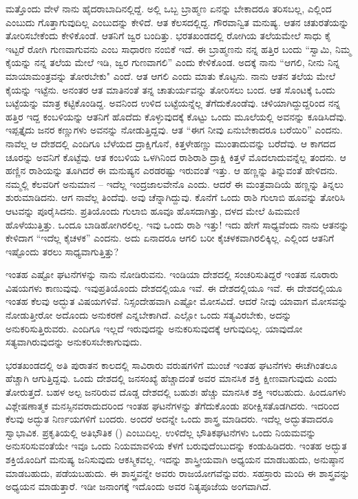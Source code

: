 ಮತ್ತೊಂದು ವೇಳೆ ನಾನು ಹೈದರಾಬಾದಿನಲ್ಲಿದ್ದೆ. ಅಲ್ಲಿ ಒಬ್ಬ ಬ್ರಾಹ್ಮಣ ಏನನ್ನು ಬೇಕಾದರೂ ತರಿಸಬಲ್ಲ, ಎಲ್ಲಿಂದ ಎಂಬುದು ಗೊತ್ತಾಗುವುದಿಲ್ಲ ಎಂಬುದನ್ನು ಕೇಳಿದೆ. ಆತ ಕೆಲಸದಲ್ಲಿದ್ದ. ಗೌರವಾನ್ವಿತ ಮನುಷ್ಯ. ಆತನ ಚತುರತೆಯನ್ನು ತೋರಿಸಬೇಕೆಂದು ಕೇಳಿಕೊಂಡೆ. ಆತನಿಗೆ ಜ್ವರ ಬಂದಿತ್ತು. ಭರತಖಂಡದಲ್ಲಿ ರೋಗಿಯ ತಲೆಯಮೇಲೆ ಸಾಧು ಕೈ ಇಟ್ಟರೆ ರೋಗಿ ಗುಣವಾಗುವನು ಎಂಬ ಸಾಧಾರಣ ನಂಬಿಕೆ ಇದೆ. ಈ ಬ್ರಾಹ್ಮಣನು ನನ್ನ ಹತ್ತಿರ ಬಂದು “ಸ್ವಾಮಿ, ನಿಮ್ಮ ಕೈಯನ್ನು ನನ್ನ ತಲೆಯ ಮೇಲೆ ಇಡಿ, ಜ್ವರ ಗುಣವಾಗಲಿ'' ಎಂದು ಕೇಳಿಕೊಂಡ. ಅದಕ್ಕೆ ನಾನು “ಆಗಲಿ, ನೀನು ನಿನ್ನ ಮಾಯಾಮಂತ್ರವನ್ನು ತೋರಬೇಕು" ಎಂದೆ. ಆತ ಆಗಲಿ ಎಂದು ಮಾತು ಕೊಟ್ಟನು. ನಾನು ಆತನ ತಲೆಯ ಮೇಲೆ ಕೈಯನ್ನು ಇಟ್ಟೆನು. ಅನಂತರ ಆತ ಮಾತಿನಂತೆ ತನ್ನ ಚಾತುರ್ಯವನ್ನು ತೋರಿಸಲು ಬಂದ. ಆತ ಸೊಂಟಕ್ಕೆ ಒಂದು ಬಟ್ಟೆಯನ್ನು ಮಾತ್ರ ಕಟ್ಟಿಕೊಂಡಿದ್ದ. ಅವನಿಂದ ಉಳಿದ ಬಟ್ಟೆಯನ್ನೆಲ್ಲ ತೆಗೆದುಕೊಂಡೆವು. ಚಳಿಯಾಗಿದ್ದುದ್ದರಿಂದ ನನ್ನ ಹತ್ತಿರ ಇದ್ದ ಕಂಬಳಿಯನ್ನು ಆತನಿಗೆ ಹೊದೆದು ಕೊಳ್ಳುವುದಕ್ಕೆ ಕೊಟ್ಟು ಒಂದು ಮೂಲೆಯಲ್ಲಿ ಅವನನ್ನು ಕೂಡಿಸಿದೆವು. ಇಪ್ಪತ್ತೈದು ಜನರ ಕಣ್ಣುಗಳು ಅವನನ್ನು ನೋಡುತ್ತಿದ್ದವು. ಆತ “ಈಗ ನೀವು ಏನುಬೇಕಾದರೂ ಬರೆಯಿರಿ'' ಎಂದನು. ನಾವೆಲ್ಲ ಆ ದೇಶದಲ್ಲಿ ಎಂದಿಗೂ ಬೆಳೆಯದ ದ್ರಾಕ್ಷಿಗೊನೆ, ಕಿತ್ತಳೇಹಣ್ಣು ಮುಂತಾದುವನ್ನು ಬರೆದೆವು. ಆ ಕಾಗದದ ಚೂರನ್ನು ಅವನಿಗೆ ಕೊಟ್ಟೆವು. ಆತ ಕಂಬಳಿಯ ಒಳಗಿನಿಂದ ರಾಶಿರಾಶಿ ದ್ರಾಕ್ಷಿ ಕಿತ್ತಳೆ ಮೊದಲಾದುವನ್ನೆಲ್ಲ ತಂದನು. ಆ ಹಣ್ಣಿನ ರಾಶಿಯನ್ನು ತೂಗಿದರೆ ಈ ಮನುಷ್ಯನ ಎರಡರಷ್ಟು ಇರುವಂತೆ ಇತ್ತು. ಆ ಹಣ್ಣನ್ನು ತಿನ್ನುವಂತೆ ಹೇಳಿದನು. ನಮ್ಮಲ್ಲಿ ಕೆಲವರಿಗೆ ಅನುಮಾನ – ಇದೆಲ್ಲ ಇಂದ್ರಜಾಲವೇನೊ ಎಂದು. ಆದರೆ ಈ ಮಂತ್ರವಾದಿಯೆ ಹಣ್ಣನ್ನು ತಿನ್ನಲು ಶುರುಮಾಡಿದನು. ಆಗ ನಾವೆಲ್ಲ ತಿಂದೆವು. ಅವು ಚೆನ್ನಾಗಿದ್ದುವು. ಕೊನೆಗೆ ಒಂದು ರಾಶಿ ಗುಲಾಬಿ ಹೂವನ್ನು ತೋರಿಸಿ ಆಟವನ್ನು ಪೂರೈಸಿದನು. ಪ್ರತಿಯೊಂದು ಗುಲಾಬಿ ಹೂವೂ ಹೊಸದಾಗಿತ್ತು, ದಳದ ಮೇಲೆ ಹಿಮಮಣಿ ಹೊಳೆಯುತ್ತಿತ್ತು. ಒಂದೂ ಬಾಡಿಹೋಗಿರಲಿಲ್ಲ. ಇವು ಒಂದು ರಾಶಿ ಇತ್ತು! ಇದು ಹೇಗೆ ಸಾಧ್ಯವೆಂದು ನಾನು ಆತನನ್ನು ಕೇಳಿದಾಗ “ಇದೆಲ್ಲ ಕೈಚಳಕ'' ಎಂದನು. ಅದು ಏನಾದರೂ ಆಗಲಿ ಬರೀ ಕೈಚಳಕವಾಗಿರಲಿಕ್ಕಿಲ್ಲ. ಎಲ್ಲಿಂದ ಆತನಿಗೆ ಇಷ್ಟೊಂದು ತರಲು ಸಾಧ್ಯವಾಗುತ್ತಿತ್ತು?

ಇಂತಹ ಎಷ್ಟೋ ಘಟನೆಗಳನ್ನು ನಾನು ನೋಡಿರುವನು. ಇಂಡಿಯಾ ದೇಶದಲ್ಲಿ ಸಂಚರಿಸುತಿದ್ದರೆ ಇಂತಹ ನೂರಾರು ವಿಷಯಗಳು ಕಾಣುವುವು. ಇವು\break ಪ್ರತಿಯೊಂದು ದೇಶದಲ್ಲಿಯೂ ಇವೆ. ಈ ದೇಶದಲ್ಲಿಯೂ ಇವೆ. ಈ ದೇಶದಲ್ಲಿಯೂ ಇಂತಹ ಕೆಲವು ಅದ್ಭುತ ವಿಷಯಗಳಿವೆ. ನಿಸ್ಸಂದೇಹವಾಗಿ ಎಷ್ಟೋ ಮೋಸವಿದೆ. ಆದರೆ ನೀವು ಯಾವಾಗ ಮೋಸವನ್ನು ನೋಡುತ್ತೀರೋ ಅದೊಂದು ಅನುಕರಣೆ ಎನ್ನಬೇಕಾಗಿದೆ. ಎಲ್ಲೋ ಒಂದು ಸತ್ಯವಿರಬೇಕು, ಅದನ್ನು ಅನುಕರಿಸುತ್ತಿರುವರು. ಎಂದಿಗೂ ಇಲ್ಲದೆ ಇರುವುದನ್ನು ಅನುಕರಿಸುವುದಕ್ಕೆ ಆಗುವುದಿಲ್ಲ. ಯಾವುದೋ ಸತ್ಯವಾಗಿರುವುದನ್ನು ಅನುಕರಿಸಬೇಕಾಗುವುದು.

ಭರತಖಂಡದಲ್ಲಿ ಅತಿ ಪುರಾತನ ಕಾಲದಲ್ಲಿ ಸಾವಿರಾರು ವರುಷಗಳಿಗೆ ಮುಂಚೆ ಇಂತಹ ಘಟನೆಗಳು ಈಚೆಗಿಂತಲೂ ಹೆಚ್ಚಾಗಿ ಆಗುತ್ತಿದ್ದವು. ಒಂದು ದೇಶದಲ್ಲಿ ಜನಸಂಖ್ಯೆ ಹೆಚ್ಚಾದಂತೆ ಅವರ ಮಾನಸಿಕ ಶಕ್ತಿ ಕ್ಷೀಣವಾಗುವುದು ಎಂದು ತೋರುತ್ತದೆ. ಬಹಳ ಅಲ್ಪ ಜನರಿರುವ ದೊಡ್ಡ ದೇಶದಲ್ಲಿ ಬಹುಶಃ ಹೆಚ್ಚು ಮಾನಸಿಕ ಶಕ್ತಿ ಇರಬಹುದು. ಹಿಂದೂಗಳು ವಿಶ್ಲೇಷಣಾತ್ಮಕ ಮನಸ್ಸಿನವರಾದುದರಿಂದ ಇಂತಹ ಘಟನೆಗಳನ್ನು ತೆಗೆದುಕೊಂಡು ಪರೀಕ್ಷಿಸತೊಡಗಿದರು. ಇದರಿಂದ ಕೆಲವು ಅದ್ಭುತ ನಿರ್ಣಯಗಳಿಗೆ ಬಂದರು. ಅಂದರೆ ಅದನ್ನೇ ಒಂದು ಶಾಸ್ತ್ರ ಮಾಡಿದರು. ಇದೆಲ್ಲ ಅದ್ಭುತವಾದರೂ ಸ್ವಾಭಾವಿಕ. ಪ್ರಕೃತಿಯಲ್ಲಿ ಅತಿಭೌತಿಕ () ಎಂಬುದಿಲ್ಲ. ಉಳಿದೆಲ್ಲ ಭೌತಿಕಘಟನೆಗಳು ಒಂದು ನಿಯಮವನ್ನು ಅನುಸರಿಸುವಂತೆಯೇ ಇವೂ ಒಂದು ನಿಯಮಾವಳಿಯ ಕೆಳಗೆ ಬರುವುದೆಂಬುದನ್ನು ಕಂಡುಹಿಡಿದರು. ಇಂತಹ ಅದ್ಭುತ ಶಕ್ತಿಯೊಂದಿಗೆ ಮನುಷ್ಯ ಜನಿಸುವುದು ಆಕಸ್ಮಿಕವಲ್ಲ. ಇದನ್ನು ಶಾಸ್ತ್ರೀಯವಾಗಿ ಅಧ್ಯಯನ ಮಾಡಬಹುದು, ಅನುಷ್ಠಾನ ಮಾಡಬಹುದು, ಪಡೆಯಬಹುದು. ಈ ಶಾಸ್ತ್ರವನ್ನೇ ಅವರು ರಾಜಯೋಗವೆನ್ನುವರು. ಸಹಸ್ರಾರು ಮಂದಿ ಈ ಶಾಸ್ತ್ರವನ್ನು ಅಧ್ಯಯನ ಮಾಡುತ್ತಾರೆ. ಇಡೀ ಜನಾಂಗಕ್ಕೆ ಇದೊಂದು ಅವರ ನಿತ್ಯಪೂಜೆಯ ಅಂಗವಾಗಿದೆ.

